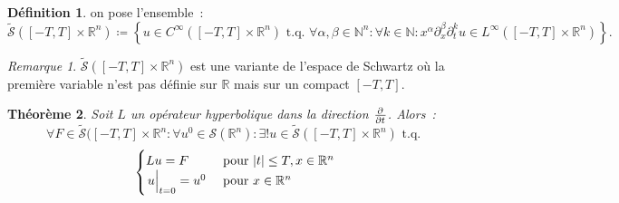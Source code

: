\documentclass{report}
\newcommand{\R}{{\mathbb R}}
\newcommand{\N}{{\mathbb N}}
\newcommand{\tq}{\text{ t.q. }}
\newcommand{\st}{\tq}
\newcommand{\restr}[2]{\left.#1\vphantom{\big|}\right|_{#2}}
\newtheorem{thm}{Théorème}[chapter]
\theoremstyle{definition}
\newtheorem{déf}[thm]{Définition}
\theoremstyle{remark}
\newtheorem*{rmq}{Remarque}
\begin{document}
\begin{déf} on pose l'ensemble~:
\[\widetilde {\mathcal S}([-T, T] \times \R^n) \coloneqq \left\{u \in C^\infty([-T, T] \times \R^n) \st \forall \alpha, \beta \in \N^n : \forall k \in \N :
	x^\alpha\partial_x^\beta\partial_t^ku \in L^\infty([-T, T] \times \R^n)\right\}.\]
\end{déf}

\begin{rmq} $\widetilde{\mathcal S}([-T, T] \times \R^n)$ est une variante de l'espace de Schwartz où la première variable n'est pas définie sur $\R$ mais sur un compact $[-T, T]$.
\end{rmq}

\begin{thm} Soit $L$ un opérateur hyperbolique dans la direction $\pd {}t$. Alors~:
\[\forall F \in \widetilde {\mathcal S}([-T, T] \times \R^n : \forall u^0 \in \mathcal S(\R^n) : \exists! u \in \widetilde {\mathcal S}([-T, T] \times \R^n) \st\]
\[\begin{cases}
	Lu = F &\text{ pour } \abs t \leq T, x \in \R^n \\
	\restr u{t=0} = u^0 &\text{ pour } x \in \R^n
\end{cases}\]
\end{thm}
\end{document}
